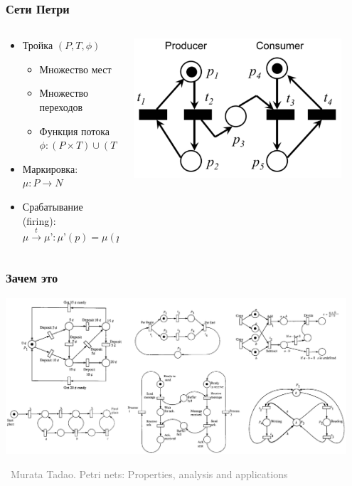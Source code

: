 \documentclass[xetex,mathserif,serif]{beamer}
\newcommand{\attribution}[1] {
	\vspace{-5mm}\begin{flushright}\begin{scriptsize}\textcolor{gray}{\textcopyright\, #1}\end{scriptsize}\end{flushright}
}
\begin{document}
	\begin{frame}
		\frametitle{Сети Петри}
		\begin{columns}
			\begin{column}{0.6\textwidth}
				\begin{itemize}
					\item Тройка $(P, T, \phi)$
					\begin{itemize}
						\item Множество мест
						\item Множество переходов
						\item Функция потока $\phi : (P \times T) \cup (T \times P) \rightarrow N$
					\end{itemize}
					\item Маркировка: $\mu : P \rightarrow N$
					\item Срабатывание (firing):
					$\mu \xrightarrow{t} \mu’ : \mu’(p) = \mu(p) - \phi(p, t) + \phi(t, p), \forall p \in P$
				\end{itemize}
			\end{column}
			\begin{column}{0.4\textwidth}
				\begin{center}
					\includegraphics[width=0.9\textwidth]{petri.png}
				\end{center}
			\end{column}
		\end{columns}
	\end{frame}

	\begin{frame}
		\frametitle{Зачем это}
		\begin{center}
			\includegraphics[width=0.95\textwidth]{petriNetExamples.png}
			\attribution{Murata Tadao. Petri nets: Properties, analysis and applications}
		\end{center}
	\end{frame}
\end{document}

